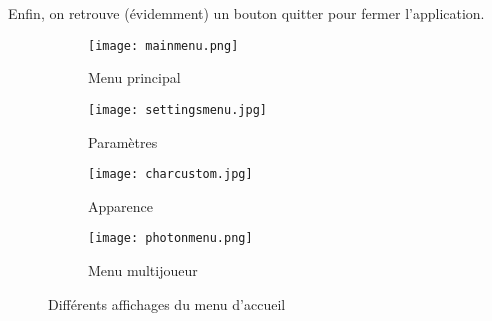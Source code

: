 \documentclass[../doc.tex]{subfiles}
\begin{document}
    Enfin, on retrouve (évidemment) un bouton quitter pour fermer l'application.
    
    \begin{figure}[hbt!]
                \centering
                \captionsetup{justification=centering}
                \begin{subfigure}[b]{0.3\textwidth}
                    \texttt{[image: mainmenu.png]} 
                    \caption{Menu principal}
                \end{subfigure}
                \hspace{150pt}
                \begin{subfigure}[b]{0.3\textwidth}
                    \texttt{[image: settingsmenu.jpg]} 
                    \caption{Paramètres}
                \end{subfigure}
                \begin{subfigure}[b]{0.3\textwidth}
                    \texttt{[image: charcustom.jpg]} 
                    \caption{Apparence}
                \end{subfigure}
                \begin{subfigure}[b]{0.3\textwidth}
                    \texttt{[image: photonmenu.png]} 
                    \caption{Menu multijoueur}
                \end{subfigure}
                \caption{Différents affichages du menu d'accueil}
    \end{figure}
\end{document}

